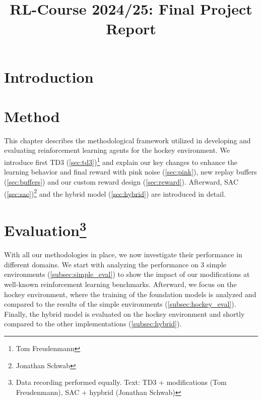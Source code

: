 \documentclass[11pt]{article}
\title{RL-Course 2024/25: Final Project Report}
\author{\theteam}
\makeatletter
\newcommand\footnoteref[1]{\protected@xdef\@thefnmark{\ref{#1}}\@footnotemark}
\makeatother
\begin{document}
\maketitle


\section{Introduction}\label{sec:intro}


\section{Method}\label{sec:Method}
This chapter describes the methodological framework utilized in developing and evaluating reinforcement learning agents for the hockey environment. We introduce first \ac{TD3} (\ref{sec:td3})\footnote{\label{foot:tom}Tom Freudenmann} and explain our key changes to enhance the learning behavior and final reward with pink noise (\ref{sec:pink})\footnoteref{foot:tom}, new replay buffers (\ref{sec:buffers})\footnoteref{foot:tom} and our custom reward design (\ref{sec:reward})\footnoteref{foot:tom}. Afterward, \ac{SAC} (\ref{sec:sac})\footnote{\label{foot:jona}Jonathan Schwab} and the hybrid model (\ref{sec:hybrid})\footnoteref{foot:jona} are introduced in detail.











\section{Evaluation\protect\footnote{Data recording performed equally. Text: TD3 + modifications (Tom Freudenmann), SAC + hypbrid (Jonathan Schwab)}}
With all our methodologies in place, we now investigate their performance in different domains. We start with analyzing the performance on 3 simple environments (\ref{subsec:simple_eval}) to show the impact of our modifications at well-known reinforcement learning benchmarks. Afterward, we focus on the hockey environment, where the training of the foundation models is analyzed and compared to the results of the simple environments (\ref{subsec:hockey_eval}). Finally, the hybrid model is evaluated on the hockey environment and shortly compared to the other implementations (\ref{subsec:hybrid}).








\end{document}

